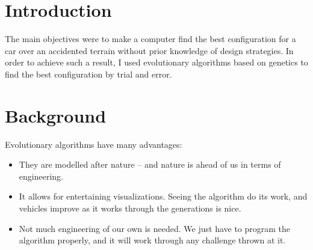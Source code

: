 \documentclass[12pt,Bold,letterpaper,TexShade]{mcgilletdclass}
\begin{document}
\maketitle%

\setcounter{secnumdepth}{4}
\setcounter{tocdepth}{4}
\begin{romanPagenumber}{2}%

%
\tableofcontents %

\end{romanPagenumber}


\GoDouble

 
\section{Introduction}
The main objectives were to make a computer find the best configuration for a car over an accidented terrain without prior knowledge of design strategies. In order to achieve such a result, I used evolutionary algorithms based on genetics to find the best configuration by trial and error. ~\cite{Geijtenbeek2013}

\section{Background}
Evolutionary algorithms have many advantages: ~\cite{miller1995genetic}
\begin{itemize}
\item They are modelled after nature -- and nature is ahead of us in terms of engineering.
\item It allows for entertaining visualizations. Seeing the algorithm do its work, and vehicles improve as it works through the generations is nice.
\item Not much engineering of our own is needed. We just have to program the algorithm properly, and it will work through any challenge thrown at it. ~\cite{MIM}
\end{itemize}
\end{document}
